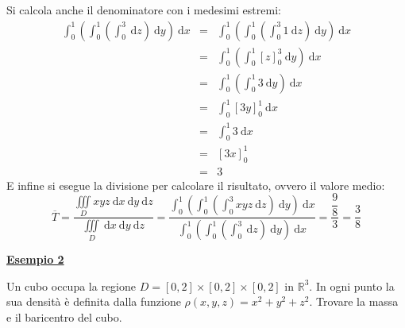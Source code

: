 \documentclass[a4paper]{article}
\newcommand{\example}[1]{\textcolor{Green4}{\textbf{#1}}}
\begin{document}
	\noindent
	Si calcola anche il denominatore con i medesimi estremi:
	\begin{equation*}
		\begin{array}{rcl}
			\displaystyle\int_{0}^{1} \left(\int_{0}^{1} \left(\int_{0}^{3} \:\mathrm{d}z\right) \: \mathrm{d}y\right) \:\mathrm{d}x
			&=&
			\displaystyle\int_{0}^{1} \left(\int_{0}^{1} \left(\int_{0}^{3} 1 \:\mathrm{d}z\right) \: \mathrm{d}y\right) \:\mathrm{d}x \\ [1.5em]
			&=&
			\displaystyle\int_{0}^{1} \left(\int_{0}^{1} \left[z\right]_{0}^{3} \: \mathrm{d}y\right) \:\mathrm{d}x \\ [1.5em]
			&=&
			\displaystyle\int_{0}^{1} \left(\int_{0}^{1} 3 \: \mathrm{d}y\right) \:\mathrm{d}x \\ [1.5em]
			&=&
			\displaystyle\int_{0}^{1} \left[3y\right]_{0}^{1} \:\mathrm{d}x \\ [1.5em]
			&=&
			\displaystyle\int_{0}^{1} 3 \:\mathrm{d}x \\ [1.5em]
			&=&
			\left[3x\right]_{0}^{1} \\ [1em]
			&=&
			3
		\end{array}
	\end{equation*}
	E infine si esegue la divisione per calcolare il risultato, ovvero il valore medio:
	\begin{equation*}
		\overline{T} 
		= 
		\dfrac{
			\displaystyle\iiint\limits_{D} xyz \:\mathrm{d}x\:\mathrm{d}y\:\mathrm{d}z
		}{
			\displaystyle\iiint\limits_{D} \:\mathrm{d}x\:\mathrm{d}y\:\mathrm{d}z
		}
		=
		\dfrac{
			\displaystyle\int_{0}^{1} \left(\int_{0}^{1} \left(\int_{0}^{3} xyz \:\mathrm{d}z\right) \: \mathrm{d}y\right) \:\mathrm{d}x
		}{
			\displaystyle\int_{0}^{1} \left(\int_{0}^{1} \left(\int_{0}^{3} \:\mathrm{d}z\right) \: \mathrm{d}y\right) \:\mathrm{d}x
		}
		=
		\dfrac{
			\dfrac{9}{8}
		}{
			3
		}
		=
		\dfrac{3}{8}
	\end{equation*} 
	
	\newpage

	\begin{flushleft}
		\example{\underline{Esempio 2}}
	\end{flushleft}
	Un cubo occupa la regione $D = \left[0,2\right] \times \left[0,2\right] \times \left[0,2\right]$ in $\mathbb{R}^{3}$. In ogni punto la sua densità è definita dalla funzione $\rho\left(x,y,z\right) = x^{2} + y^{2} + z^{2}$. Trovare la massa e il baricentro del cubo.\newline
\end{document}
